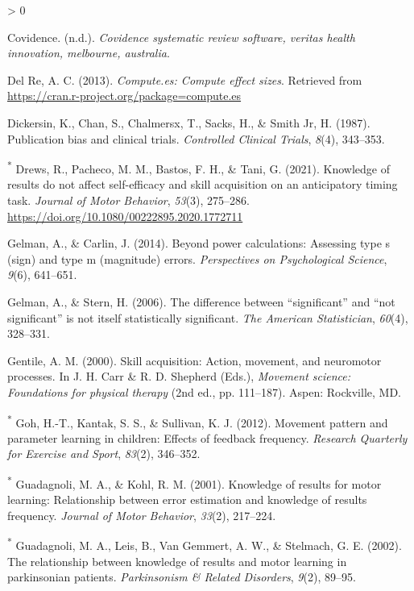 \documentclass[
  english,
  man, donotrepeattitle,mask,floatsintext]{apa7}
\newlength{\cslhangindent}
\newenvironment{CSLReferences}[2] %
 {%
  \setlength{\parindent}{0pt}
  \ifodd #1 \everypar{\setlength{\hangindent}{\cslhangindent}}\ignorespaces\fi
  \ifnum #2 > 0
  \setlength{\parskip}{#2\baselineskip}
  \fi
 }%
 {}
\begin{document}
\begin{CSLReferences}{1}{0}
\leavevmode\hypertarget{ref-Covidence}{}%
Covidence. (n.d.). \emph{Covidence systematic review software, veritas health innovation, melbourne, australia}.

\leavevmode\hypertarget{ref-DelRe2013}{}%
Del Re, A. C. (2013). \emph{Compute.es: Compute effect sizes}. Retrieved from \url{https://cran.r-project.org/package=compute.es}

\leavevmode\hypertarget{ref-Dickersin1987}{}%
Dickersin, K., Chan, S., Chalmersx, T., Sacks, H., \& Smith Jr, H. (1987). Publication bias and clinical trials. \emph{Controlled Clinical Trials}, \emph{8}(4), 343--353.

\leavevmode\hypertarget{ref-Drews2021}{}%
\textsuperscript{*} Drews, R., Pacheco, M. M., Bastos, F. H., \& Tani, G. (2021). Knowledge of results do not affect self-efficacy and skill acquisition on an anticipatory timing task. \emph{Journal of Motor Behavior}, \emph{53}(3), 275--286. \url{https://doi.org/10.1080/00222895.2020.1772711}

\leavevmode\hypertarget{ref-Gelman2014}{}%
Gelman, A., \& Carlin, J. (2014). Beyond power calculations: Assessing type s (sign) and type m (magnitude) errors. \emph{Perspectives on Psychological Science}, \emph{9}(6), 641--651.

\leavevmode\hypertarget{ref-Gelman2006}{}%
Gelman, A., \& Stern, H. (2006). The difference between {``significant''} and {``not significant''} is not itself statistically significant. \emph{The American Statistician}, \emph{60}(4), 328--331.

\leavevmode\hypertarget{ref-Gentile2000}{}%
Gentile, A. M. (2000). Skill acquisition: Action, movement, and neuromotor processes. In J. H. Carr \& R. D. Shepherd (Eds.), \emph{Movement science: Foundations for physical therapy} (2nd ed., pp. 111--187). Aspen: Rockville, MD.

\leavevmode\hypertarget{ref-Goh2012}{}%
\textsuperscript{*} Goh, H.-T., Kantak, S. S., \& Sullivan, K. J. (2012). Movement pattern and parameter learning in children: Effects of feedback frequency. \emph{Research Quarterly for Exercise and Sport}, \emph{83}(2), 346--352.

\leavevmode\hypertarget{ref-Guadagnoli2001}{}%
\textsuperscript{*} Guadagnoli, M. A., \& Kohl, R. M. (2001). Knowledge of results for motor learning: Relationship between error estimation and knowledge of results frequency. \emph{Journal of Motor Behavior}, \emph{33}(2), 217--224.

\leavevmode\hypertarget{ref-Guadagnoli2002}{}%
\textsuperscript{*} Guadagnoli, M. A., Leis, B., Van Gemmert, A. W., \& Stelmach, G. E. (2002). The relationship between knowledge of results and motor learning in parkinsonian patients. \emph{Parkinsonism \& Related Disorders}, \emph{9}(2), 89--95.


\end{CSLReferences}
\end{document}
